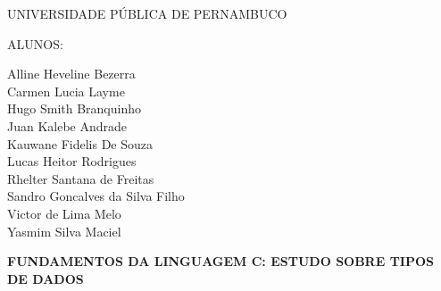 \documentclass{article}
\begin{document}

\begin{titlepage}
\centering

{\Large UNIVERSIDADE PÚBLICA DE PERNAMBUCO\par}

\vspace{2cm}

{\large ALUNOS:\par}

\vspace{0.5cm}

Alline Heveline Bezerra\\
Carmen Lucia Layme\\
Hugo Smith Branquinho\\
Juan Kalebe Andrade\\
Kauwane Fidelis De Souza\\
Lucas Heitor Rodrigues\\
Rhelter Santana de Freitas\\
Sandro Goncalves da Silva Filho\\
Victor de Lima Melo\\
Yasmim Silva Maciel\\

\vfill

{\LARGE \textbf{FUNDAMENTOS DA LINGUAGEM C: ESTUDO SOBRE TIPOS DE DADOS}\par}

\vfill

\end{titlepage}

\end{document}

